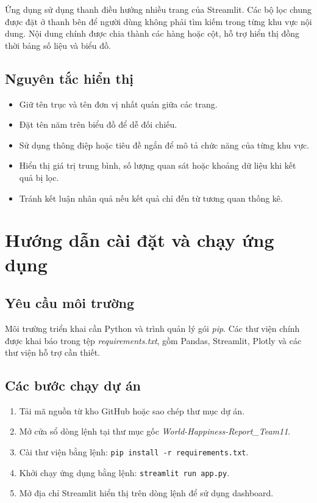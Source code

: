 Ứng dụng sử dụng thanh điều hướng nhiều trang của Streamlit. Các bộ lọc chung được đặt ở thanh bên để người dùng không phải tìm kiếm trong từng khu vực nội dung. Nội dung chính được chia thành các hàng hoặc cột, hỗ trợ hiển thị đồng thời bảng số liệu và biểu đồ.

\subsection{Nguyên tắc hiển thị}

\begin{itemize}
    \item Giữ tên trục và tên đơn vị nhất quán giữa các trang.
    \item Đặt tên năm trên biểu đồ để dễ đối chiếu.
    \item Sử dụng thông điệp hoặc tiêu đề ngắn để mô tả chức năng của từng khu vực.
    \item Hiển thị giá trị trung bình, số lượng quan sát hoặc khoảng dữ liệu khi kết quả bị lọc.
    \item Tránh kết luận nhân quả nếu kết quả chỉ đến từ tương quan thống kê.
\end{itemize}

\section{Hướng dẫn cài đặt và chạy ứng dụng}

\subsection{Yêu cầu môi trường}

Môi trường triển khai cần Python và trình quản lý gói \textit{pip}. Các thư viện chính được khai báo trong tệp \textit{requirements.txt}, gồm Pandas, Streamlit, Plotly và các thư viện hỗ trợ cần thiết.

\subsection{Các bước chạy dự án}

\begin{enumerate}
    \item Tải mã nguồn từ kho GitHub hoặc sao chép thư mục dự án.
    \item Mở cửa sổ dòng lệnh tại thư mục gốc \textit{World-Happiness-Report\_Team11}.
    \item Cài thư viện bằng lệnh: \texttt{pip install -r requirements.txt}.
    \item Khởi chạy ứng dụng bằng lệnh: \texttt{streamlit run app.py}.
    \item Mở địa chỉ Streamlit hiển thị trên dòng lệnh để sử dụng dashboard.
\end{enumerate}

